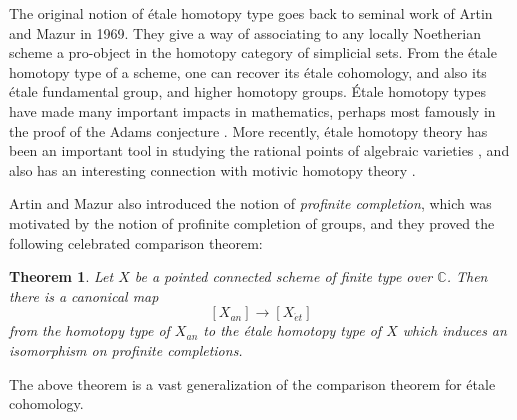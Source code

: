 \documentclass[12pt]{amsart}
\newtheorem{theorem}[dummy]{Theorem}
\theoremstyle{definition}
\newcommand{\bC}{\mathbb{C}}
\newcommand{\et}{\acute{e}t}
\begin{document}
The original notion of \'etale homotopy type goes back to seminal work of Artin and Mazur \cite{ArtinMazur} in 1969. They give a way of associating to any locally Noetherian scheme a pro-object in the homotopy category of simplicial sets. From the \'etale homotopy type of a scheme, one can recover its \'etale cohomology, and also its \'etale fundamental group, and higher homotopy groups. \'Etale homotopy types have made many important impacts in mathematics, perhaps most famously in the proof of the Adams conjecture \cite{Quillen,sullivan,Friedlander2}. More recently, \'etale homotopy theory has been an important tool in studying the rational points of algebraic varieties \cite{harpaztomer,ambrus,torsors}, and also has an interesting connection with motivic homotopy theory \cite{realization,schmidt}.

Artin and Mazur also introduced the notion of \emph{profinite completion}, which was motivated by the notion of profinite completion of groups, and they proved the following celebrated comparison theorem:

\begin{theorem}\cite[Theorem 12.9]{ArtinMazur}
Let $X$ be a pointed connected scheme of finite type over $\bC$. Then there is a canonical map $$\left[X_{an}\right] \to \left[X_{\et}\right]$$ from the homotopy type of $X_{an}$ to the \'etale homotopy type of $X$ which induces an isomorphism on profinite completions.
\end{theorem}

The above theorem is a vast generalization of the comparison theorem for \'etale cohomology.
\end{document}
